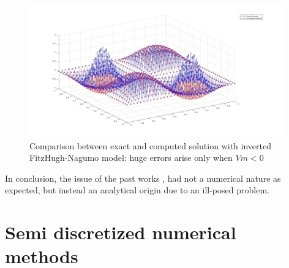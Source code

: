 \documentclass[a4paper,11pt]{article}
\begin{document}
\begin{figure}[h]
	\begin{center}
		\includegraphics[width = 11cm]{./sol_ill_posed.jpg}
		\caption{Comparison between exact and computed solution with inverted FitzHugh-Nagumo model: huge errors arise only when $Vm<0$}
		\label{sol_ill_posed}
	\end{center}
\end{figure}
    
    \noindent In conclusion, the issue of the past works \cite{andreotti}, \cite{marta} had not a numerical nature as expected, but instead an analytical origin due to an ill-posed problem.



    \section{Semi discretized numerical methods}
\end{document}
